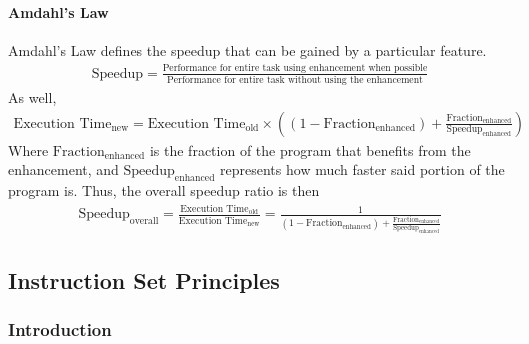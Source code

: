 \paragraph{Amdahl's Law}
Amdahl's Law defines the speedup that can be gained by a particular feature.
\begin{align*}
    \text{Speedup} = \frac{\text{Performance for entire task using enhancement when possible}}{\text{Performance for entire task without using the enhancement}}
\end{align*}
As well,
\begin{align*}
    \text{Execution Time}_\text{new} = \text{Execution Time}_\text{old}\times ((1-\text{Fraction}_\text{enhanced})+\frac{\text{Fraction}_\text{enhanced}}{\text{Speedup}_\text{enhanced}})
\end{align*}
Where $\text{Fraction}_\text{enhanced}$ is the fraction of the program that benefits from the enhancement, and $\text{Speedup}_\text{enhanced}$ represents how much faster said portion of the program is. Thus, the overall speedup ratio is then
\begin{align*}
    \text{Speedup}_\text{overall} = \frac{\text{Execution Time}_\text{old}}{\text{Execution Time}_\text{new}}=\frac{1}{(1-\text{Fraction}_\text{enhanced})+\frac{\text{Fraction}_\text{enhanced}}{\text{Speedup}_\text{enhanced}}}
\end{align*}

\subsection{Instruction Set Principles}\label{sec:isa}

\subsubsection{Introduction}
